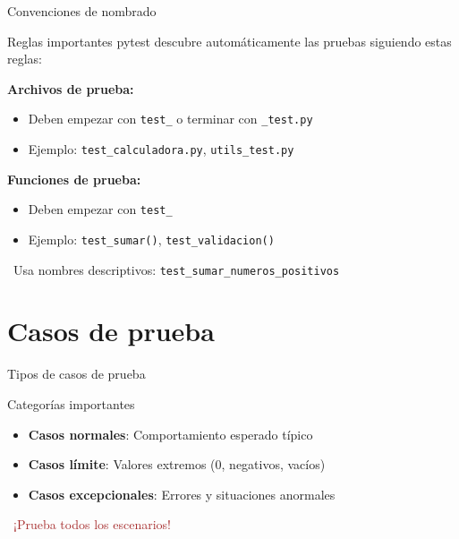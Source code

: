 \documentclass{beamer}
\begin{document}
\begin{frame}[fragile]{Convenciones de nombrado \faTag}
\begin{conceptbox}{Reglas importantes}
\small
pytest descubre automáticamente las pruebas siguiendo estas reglas:
\end{conceptbox}

\vspace{0.2cm}
\textbf{Archivos de prueba:}
\begin{itemize}
    \item[\faFile] Deben empezar con \texttt{test\_} o terminar con \texttt{\_test.py}
    \item[\faFile] Ejemplo: \texttt{test\_calculadora.py}, \texttt{utils\_test.py}
\end{itemize}

\vspace{0.2cm}
\textbf{Funciones de prueba:}
\begin{itemize}
    \item[\faCode] Deben empezar con \texttt{test\_}
    \item[\faCode] Ejemplo: \texttt{test\_sumar()}, \texttt{test\_validacion()}
\end{itemize}

\vspace{0.2cm}
\begin{notebox}
\small\faLightbulb\ Usa nombres descriptivos: \texttt{test\_sumar\_numeros\_positivos}
\end{notebox}
\end{frame}

\section{Casos de prueba}

\begin{frame}[fragile]{Tipos de casos de prueba \faList}
\begin{conceptbox}{Categorías importantes}
\small
\begin{itemize}
    \item[\faCheck] \textbf{Casos normales}: Comportamiento esperado típico
    \item[\faExclamation] \textbf{Casos límite}: Valores extremos (0, negativos, vacíos)
    \item[\faBug] \textbf{Casos excepcionales}: Errores y situaciones anormales
\end{itemize}
\end{conceptbox}

\vspace{0.2cm}
\begin{center}
\textcolor{brown}{\faLightbulb\ ¡Prueba todos los escenarios!}
\end{center}
\end{frame}
\end{document}
